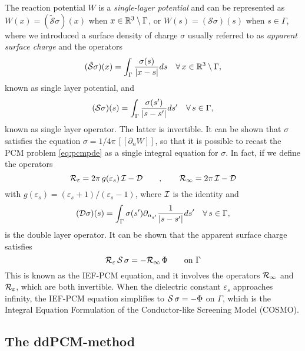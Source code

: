 The reaction potential $W$ is a \emph{single-layer potential} and can be represented\cite{sauter2010boundary} as $W(x) = (\tilde{\mathcal{S}}\sigma)(x)$ when $x \in \mathbb{R}^3 \setminus \Gamma$, or $W(s) = (\mathcal{S}\sigma)(s)$ when $s \in \Gamma$, where we introduced a surface density of charge $\sigma$ usually referred to as \emph{apparent surface charge} and the operators
\begin{equation}
 \label{eq:Stilde}
 (\tilde{\mathcal{S}}\sigma)(x) = \int_{\Gamma} \frac{\sigma(s)}{|x-s|} ds\quad \forall\, x \in \mathbb{R}^3 \setminus \Gamma,
\end{equation}
known as single layer potential, and 
\begin{equation}
 \label{eq:Soper}
 ({\mathcal{S}}\sigma)(s) = \int_{\Gamma} \frac{\sigma(s')}{|s-s'|} ds'\quad \forall\, s \in \Gamma,
\end{equation}
known as single layer operator. The latter is invertible\cite{Calderon}. 
It can be shown that $\sigma$ satisfies the equation $\sigma = 1/4\pi \, [\![ \partial_n W]\!]$, so that it is possible to recast the PCM problem \eqref{eq:pcmpde} as a single integral equation for $\sigma$. In fact, if we define the operators 
\begin{equation}
 \label{eq:Reps}
 \mathcal{R}_\varepsilon = 2\pi \, g(\varepsilon_s) \, \mathcal{I} - \mathcal{D} \qquad, \qquad \mathcal{R}_\infty = 2\pi \, \mathcal{I} - \mathcal{D}
\end{equation}
with $g(\varepsilon_s) = (\varepsilon_s+1)/(\varepsilon_s-1)$, where $\mathcal{I}$ is the identity and 
\begin{equation}
 \label{eq:DOper}
 ({\mathcal{D}}\sigma)(s) = \int_{\Gamma} \sigma(s') \partial_{n_{s'}} \frac{1}{|s-s'|} ds'\quad \forall\, s \in \Gamma,
\end{equation}
is the double layer operator. It can be shown\cite{ReviewPCM_2005} that the apparent surface charge satisfies
\begin{equation}
\label{eq:IEFPCM}
\mathcal{R}_\varepsilon \, \mathcal{S} \, \sigma = - \mathcal{R}_\infty \, \Phi \qquad \text{on }\Gamma
\end{equation}
This is known as the IEF-PCM equation, and it involves the operators $\mathcal{R}_\infty$ and $\mathcal{R}_\varepsilon$, which are both invertible. When the dielectric constant $\varepsilon_s$ approaches infinity, the IEF-PCM equation simplifies to $\mathcal{S} \, \sigma = - \Phi$ on $\Gamma$, which is the Integral Equation Formulation of the Conductor-like Screening Model (COSMO)\cite{Lipparini_JCP_VPCM}.


\subsection{The ddPCM-method}


